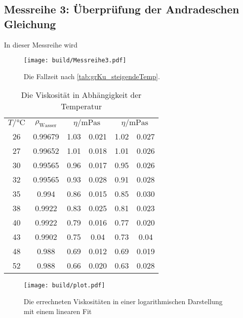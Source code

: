 
\subsection[]{Messreihe 3: Überprüfung der Andradeschen Gleichung}

In dieser Messreihe wird

\begin{figure}
    \centering
    \texttt{[image: build/Messreihe3.pdf]}
    \caption{Die Fallzeit nach \ref{tab:grKu_steigendeTemp}.}
    \label{fig:groKu_steigendeTemp}
\end{figure}


\begin{table}
    \centering
    \begin{tabular}[]{S[table-format=2.0] S[table-format=0.5] S @{${}\pm{}$} S[table-format=1.3] S @{${}\pm{}$} S[table-format=1.3]}
        \toprule
        {$T /\unit{\celsius}$} & {$\rho_{\text{Wasser}}$ \cite{geschke}} &  &  \\
            26  &  0.99679   & 1.03  & 0.021 &        1.02 & 0.027  \\
            27  &  0.99652   & 1.01  & 0.018 &        1.01 & 0.026  \\
            30  &  0.99565   & 0.96  & 0.017 &        0.95 & 0.026  \\
            32  &  0.99565   & 0.93  & 0.028 &        0.91 & 0.028  \\
            35  &  0.994     & 0.86  & 0.015 &        0.85 & 0.030  \\
            38  &  0.9922    & 0.83  & 0.025 &        0.81 & 0.023  \\
            40  &  0.9922    & 0.79  & 0.016 &        0.77 & 0.020  \\
            43  &  0.9902    & 0.75  & 0.04  &        0.73 & 0.04   \\
            48  &  0.988     & 0.69  & 0.012 &        0.69 & 0.019  \\
            52  &  0.988     & 0.66  & 0.020 &        0.63 & 0.028  \\
    \end{tabular}
    \caption{Die Viskosität in Abhängigkeit der Temperatur}
    \label{tab:viskositaeten_temp}
\end{table}
\begin{figure}
    \centering
    \texttt{[image: build/plot.pdf]}
    \caption{Die errechneten Viskositäten in einer logarithmischen Darstellung mit einem linearen Fit}
    \label{fig:groKu_steigendeTemp_eta_fit}
\end{figure}
